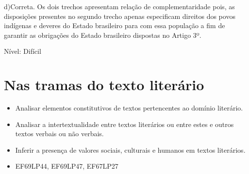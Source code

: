 {d)Correta. Os dois trechos apresentam relação de complementaridade pois,
as disposições presentes no segundo trecho apenas especificam direitos
dos povos indígenas e deveres do Estado brasileiro para com essa
população a fim de garantir as obrigações do Estado brasileiro dispostas
no Artigo 3º.

Nível: Difícil

\chapter{Nas tramas do texto literário}


\begin{itemize}
  
\item Analisar elementos constitutivos de textos pertencentes ao domínio literário.
  
  \item Analisar a intertextualidade entre textos literários ou entre estes e outros textos 
verbais ou não verbais.
  
  \item Inferir a presença de valores sociais, culturais e humanos em textos literários.

\end{itemize}


\begin{itemize}

  \item EF69LP44, EF69LP47, EF67LP27

\end{itemize}

}
